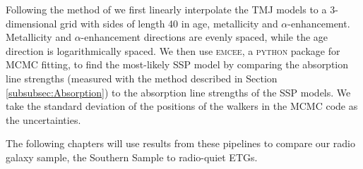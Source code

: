 			Following the method of \citet{McDermid2006} we first linearly interpolate the TMJ models to a 3-dimensional grid with sides of length 40 in age, metallicity and $\alpha$-enhancement. Metallicity and $\alpha$-enhancement directions are evenly spaced, while the age direction is logarithmically spaced. We then use \textsc{emcee}, a \textsc{python} package for MCMC fitting, to find the most-likely SSP model by comparing the absorption line strengths (measured with the method described in Section \ref{subsubsec:Absorption}) to the absorption line strengths of the SSP models. We take the standard deviation of the positions of the walkers in the MCMC code as the uncertainties.

			The following chapters will use results from these pipelines to compare our radio galaxy sample, the Southern Sample to radio-quiet ETGs.
